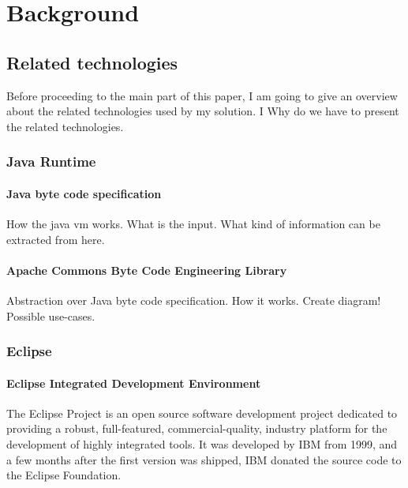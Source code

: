 \chapter{Background}


\section{Related technologies}
Before proceeding to the main part of this paper, I am going to give an overview
about the related technologies used by my solution. I Why do we have to present
the related technologies.

\subsection{Java Runtime}

\subsubsection{Java byte code specification}
How the java vm works.
What is the input.
What kind of information can be extracted from here.

\subsubsection{Apache Commons Byte Code Engineering Library}
\cite{BCEL}
Abstraction over Java byte code specification. 
How it works. Create diagram!
Possible use-cases.


\subsection{Eclipse}

\subsubsection{Eclipse Integrated Development Environment}
The Eclipse Project \cite{Eclipseproject} is an open source software development
project dedicated to providing a robust, full-featured, commercial-quality,
industry platform for the development of highly integrated tools. It was
developed by IBM from 1999, and a few months after the first version was
shipped, IBM donated the source code to the Eclipse Foundation.

